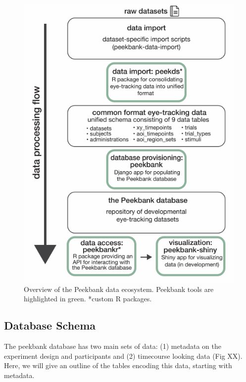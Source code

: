 \documentclass[
  english,
  man,floatsintext]{apa6}
\begin{document}
\begin{figure}

{\centering \includegraphics{peekbank-brm_files/figure-latex/fig-framework-overview-1} 

}

\caption{Overview of the Peekbank data ecosystem. Peekbank tools are highlighted in green. *custom R packages.}\label{fig:fig-framework-overview}
\end{figure}

\hypertarget{database-schema}{%
\subsection{Database Schema}\label{database-schema}}

The peekbank database has two main sets of data: (1) metadata on the experiment design and participants and (2) timecourse looking data (Fig XX). Here, we will give an outline of the tables encoding this data, starting with metadata.
\end{document}
